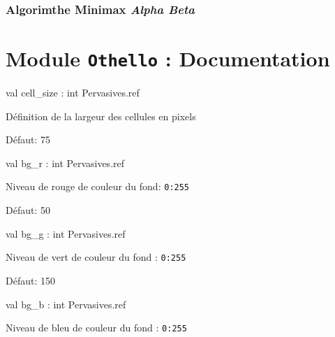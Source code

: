 \documentclass[11pt]{article}
\newcommand{\tmem}[1]{{\em #1\/}}
\begin{document}
\subsubsection{Algorimthe Minimax \tmem{Alpha Beta}}

\section{Module {\tt{Othello}} : Documentation}
\label{module:Othello}




\ocamldocvspace{0.5cm}



\label{val:Othello.cell-underscoresize}\begin{ocamldoccode}
val cell_size : int Pervasives.ref
\end{ocamldoccode}
\begin{ocamldocdescription}
Définition de la largeur des cellules en pixels


\end{ocamldocdescription}




Défaut: 75



\label{val:Othello.bg-underscorer}\begin{ocamldoccode}
val bg_r : int Pervasives.ref
\end{ocamldoccode}
\begin{ocamldocdescription}
Niveau de rouge de couleur du fond: {\tt{0:255}}


\end{ocamldocdescription}




Défaut: 50



\label{val:Othello.bg-underscoreg}\begin{ocamldoccode}
val bg_g : int Pervasives.ref
\end{ocamldoccode}
\begin{ocamldocdescription}
Niveau de vert de couleur du fond : {\tt{0:255}}


\end{ocamldocdescription}




Défaut: 150



\label{val:Othello.bg-underscoreb}\begin{ocamldoccode}
val bg_b : int Pervasives.ref
\end{ocamldoccode}
\begin{ocamldocdescription}
Niveau de bleu de couleur du fond : {\tt{0:255}}


\end{ocamldocdescription}
\end{document}
